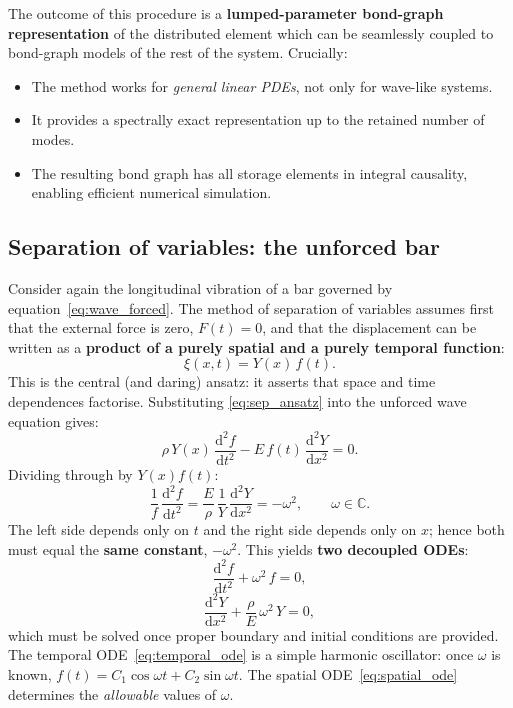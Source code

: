 The outcome of this procedure is a \textbf{lumped-parameter bond-graph
representation} of the distributed element which can be seamlessly coupled to
bond-graph models of the rest of the system.  Crucially:
\begin{itemize}[leftmargin=2em,itemsep=2pt]
  \item The method works for \emph{general linear PDEs}, not only for wave-like
    systems.
  \item It provides a spectrally exact representation up to the retained number
    of modes.
  \item The resulting bond graph has all storage elements in integral causality,
    enabling efficient numerical simulation.
\end{itemize}


\subsection{Separation of variables: the unforced bar}
\label{ssec:sov_unforced}

Consider again the longitudinal vibration of a bar governed by
equation~\eqref{eq:wave_forced}.  The method of separation of variables assumes
first that the external force is zero, $F(t) = 0$, and that the displacement
can be written as a \textbf{product of a purely spatial and a purely temporal
function}:
\begin{equation}
  \xi(x,t) = Y(x)\,f(t).
  \label{eq:sep_ansatz}
\end{equation}
This is the central (and daring) ansatz: it asserts that space and time
dependences factorise.  Substituting \eqref{eq:sep_ansatz} into the unforced
wave equation gives:
\begin{equation}
  \rho\,Y(x)\,\frac{\mathrm{d}^{2}f}{\mathrm{d}t^{2}}
  - E\,f(t)\,\frac{\mathrm{d}^{2}Y}{\mathrm{d}x^{2}} = 0.
\end{equation}
Dividing through by $Y(x)f(t)$:
\begin{equation}
  \frac{1}{f}\,\frac{\mathrm{d}^{2}f}{\mathrm{d}t^{2}}
  = \frac{E}{\rho}\,\frac{1}{Y}\,\frac{\mathrm{d}^{2}Y}{\mathrm{d}x^{2}}
  = -\omega^{2},
  \qquad \omega \in \mathbb{C}.
  \label{eq:sov_separation}
\end{equation}
The left side depends only on $t$ and the right side depends only on $x$; hence
both must equal the \textbf{same constant}, $-\omega^{2}$.  This yields
\textbf{two decoupled ODEs}:
\begin{equation}
  \frac{\mathrm{d}^{2}f}{\mathrm{d}t^{2}} + \omega^{2}\,f = 0,
  \label{eq:temporal_ode}
\end{equation}
\begin{equation}
  \frac{\mathrm{d}^{2}Y}{\mathrm{d}x^{2}} + \frac{\rho}{E}\,\omega^{2}\,Y = 0,
  \label{eq:spatial_ode}
\end{equation}
which must be solved once proper boundary and initial conditions are provided.
The temporal ODE~\eqref{eq:temporal_ode} is a simple harmonic oscillator: once
$\omega$ is known, $f(t) = C_{1}\cos\omega t + C_{2}\sin\omega t$.  The
spatial ODE~\eqref{eq:spatial_ode} determines the \emph{allowable} values of
$\omega$.


